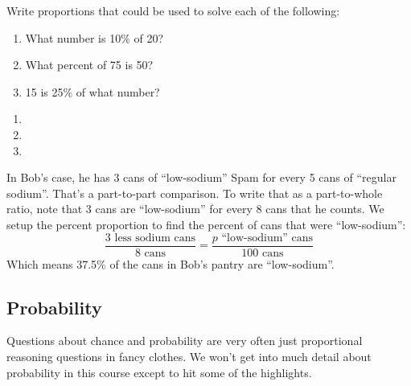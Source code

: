 \begin{boxex}
Write proportions that could be used to solve each of the following:
\begin{enumerate}
	\item What number is 10\% of 20?
	\item What percent of 75 is 50?
	\item 15 is 25\% of what number?
\end{enumerate}

\expsoln
\begin{enumerate}
	\item {}

	\item {}

	\item {}
\end{enumerate}
\end{boxex}

In Bob's case, he has 3 cans of ``low-sodium'' Spam for every 5 cans of ``regular sodium''. That's a part-to-part comparison. To write that as a part-to-whole ratio, note that 3 cans are ``low-sodium'' for every 8 cans that he counts. We setup the percent proportion to find the percent of cans that were ``low-sodium'':
\[\frac{3\text{ less sodium cans}}{8 \text{ cans}} = \frac{p \text{ ``low-sodium'' cans}}{100 \text{ cans}}\]
Which means 37.5\% of the cans in Bob's pantry are ``low-sodium''.

\subsection{Probability}

Questions about chance and probability are very often just proportional reasoning questions in fancy clothes. We won't get into much detail about probability in this course except to hit some of the highlights.


